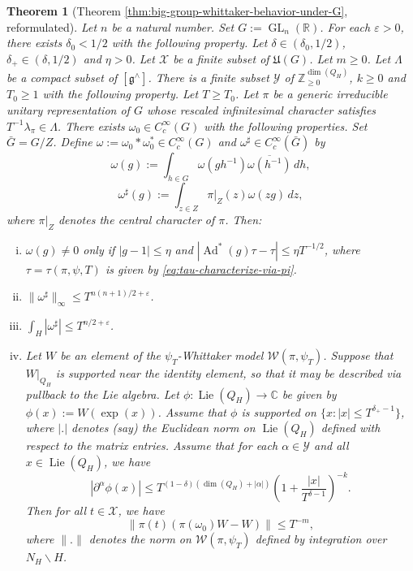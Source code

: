 \documentclass[reqno]{amsart}
\DeclareMathOperator{\GL}{GL}
\DeclareMathOperator{\Ad}{Ad}
\def\eps{\varepsilon}
\DeclareMathOperator{\Lie}{Lie}
\theoremstyle{plain} \newtheorem{theorem} {Theorem}
\theoremstyle{definition} \newtheorem{definition} [theorem] {Definition}
\theoremstyle{itplain} %
\numberwithin{equation}{section}
\numberwithin{theorem}{section}
\renewcommand{\geq}{\geqslant}
\renewcommand{\leq}{\leqslant}
\begin{document}
\begin{theorem}[Theorem \ref{thm:big-group-whittaker-behavior-under-G}, reformulated]
  Let $n$ be a natural number.  Set $G := \GL_n(\mathbb{R})$.  For each $\eps > 0$, there exists $\delta _0 < 1/2$ with the following property.  Let $\delta \in (\delta_0, 1/2)$, $\delta_+ \in (\delta, 1/2)$ and $\eta > 0$.  Let $\mathcal{X}$ be a finite subset of $\mathfrak{U}(G)$.  Let $m \geq 0$.  Let $\Lambda$ be a compact subset of $[\mathfrak{g}^\wedge]$.  There is a finite subset $\mathcal{Y}$ of $\mathbb{Z}_{\geq 0}^{\dim(Q_H)}$, $k \geq 0$ and $T_0 \geq 1$ with the following property.  Let $T \geq T_0$.  Let $\pi$ be a generic irreducible unitary representation of $G$ whose rescaled infinitesimal character satisfies $T^{-1} \lambda_\pi \in \Lambda$.  There exists $\omega_0 \in C_c^\infty(G)$ with the following properties.  Set $\bar{G} = G/Z$.  Define $\omega := \omega_0 \ast \omega_0^\ast \in C_c^\infty(G)$ and $\omega^\sharp \in C_c^\infty(\bar{G})$ by
  \begin{equation*}
    \omega(g) := \int _{h \in G} \omega(g h^{-1}) \overline{\omega(h^{-1})} \, d h,
  \end{equation*}
  \begin{equation*}
    \omega^\sharp (g) := \int _{z \in Z}
    \pi|_Z (z) \omega(z g) \, d z,
  \end{equation*}
  where $\pi|_Z$ denotes the central character of $\pi$.  Then:
  \begin{enumerate}[(i)]
  \item  $\omega(g) \neq 0$ only if $|g -1| \leq \eta$ and $|\Ad^*(g) \tau - \tau| \leq \eta T^{-1/2}$, where $\tau = \tau(\pi,\psi,T)$ is given by \eqref{eq:tau-characterize-via-pi}.
  \item $\|\omega^\sharp\|_{\infty} \leq T^{n(n+1)/2+\eps}$.
  \item $\int_H |\omega^\sharp| \leq T^{n/2 + \eps}$.
  \item Let $W$ be an element of the $\psi_T$-Whittaker model $\mathcal{W}(\pi,\psi_T)$.  Suppose that $W|_{Q_H}$ is supported near the identity element, so that it may be described via pullback to the Lie algebra.  Let $\phi : \Lie(Q_H) \rightarrow \mathbb{C}$ be given by $\phi(x) := W(\exp(x))$.  Assume that $\phi$ is supported on $\{x : |x| \leq T^{\delta_+ - 1}\}$, where $|.|$ denotes (say) the Euclidean norm on $\Lie(Q_H)$ defined with respect to the matrix entries.  Assume that for each $\alpha \in \mathcal{Y}$ and all $x \in \Lie(Q_H)$, we have
    \begin{equation*}
      \left\lvert \partial^\alpha \phi(x) \right\rvert \leq T^{(1 - \delta) (\dim(Q_H) + |\alpha|)} \left( 1 + \frac{|x|}{T^{\delta-1}} \right)^{-k}.
    \end{equation*}
    Then for all $t\in \mathcal{X}$, we have
    \begin{equation*}
      \|\pi(t) (\pi(\omega_0)W - W)\| \leq T^{-m},
    \end{equation*}
    where $\|.\|$ denotes the norm on $\mathcal{W}(\pi,\psi_T)$ defined by integration over $N_H \backslash H$.
  \end{enumerate}
\end{theorem}





\printindex




{} 
\end{document}
